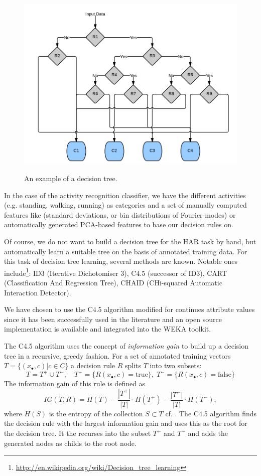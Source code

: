 \begin{figure}[h]
\centering
\includegraphics[width=0.5 \textwidth]{img/har/decision_tree.png}
\label{fig:decision_tree}
\caption{An example of a decision tree.}
\end{figure}

In the case of the activity recognition classifier, we have the
different activities (e.g. standing, walking, running) as 
categories and a set of manually computed features like (standard
deviations, or bin distributions of Fourier-modes) or automatically
generated PCA-based features to base our decision rules on.

Of course, we do not want to build a decision tree for the HAR task by
hand, but automatically learn a suitable tree on the basis of
annotated training data. For this task of decision tree learning,
several methods are known. Notable ones
include\footnote{\url{http://en.wikipedia.org/wiki/Decision_tree_learning}}:
ID3 (Iterative Dichotomiser 3), C4.5 (successor of ID3), CART
(Classification And Regression Tree), CHAID (CHi-squared Automatic
Interaction Detector).

We have chosen to use the C4.5 algorithm modified for continues
attribute values \cite{quinlan1996improved} since it has been
successfully used in the literature \cite{lara12} and an open source
implementation is available and integrated into the WEKA toolkit.

The C4.5 algorithm uses the concept of {\it information gain} to build
up a decision tree in a recursive, greedy fashion.  For a set of
annotated training vectors $T = \{ (x_\bullet, c) | c \in C \}$ a
decision rule $R$ splits $T$ into two subsets:
\[ T = T^+ \cup T^{-}, \quad T^+ = \{ R(x_\bullet, c) = \text{true}\}, \;
T^- = \{ R(x_\bullet, c) = \text{false} \} \]
The information gain of this rule is defined as 
\[ IG(T,R) = H(T) - \frac{|T^+|}{|T|} \cdot H(T^+) - \frac{|T^-|}{|T|} \cdot H(T^-), \]
where $H(S)$ is the entropy of the collection $S \subset T$
cf. \cite{Shannon1948}. The C4.5 algorithm finds the decision rule
with the largest information gain and uses this as the root for the
decision tree. It the recurses into the subset $T^+$ and $T^-$ and
adds the generated nodes as childs to the root node.

